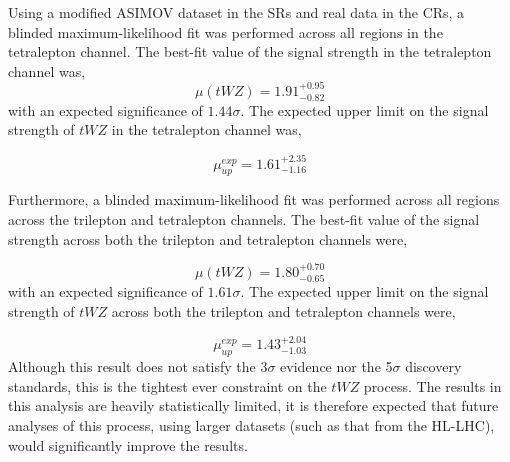 Using a modified ASIMOV dataset in the SRs and real data in the CRs, a blinded maximum-likelihood fit was performed across all regions in the tetralepton channel. The best-fit value of the signal strength in the tetralepton channel was,
\begin{equation}
  \mu (tWZ) =   1.91^{+0.95}_{-0.82}
\end{equation}
with an expected significance of $1.44\sigma$. The expected upper limit on the signal strength of $tWZ$ in the tetralepton channel was,

\begin{equation}
  \mu_{up}^{exp} =   1.61^{+2.35}_{-1.16}
\end{equation}

Furthermore, a blinded maximum-likelihood fit was performed across all regions across the trilepton and tetralepton channels. The best-fit value of the signal strength across both the trilepton and tetralepton channels were,

\begin{equation}
  \mu (tWZ) =   1.80^{+0.70}_{-0.65}
\end{equation}
with an expected significance of $1.61\sigma$. The expected upper limit on the signal strength of $tWZ$ across both the trilepton and tetralepton channels were,

\begin{equation}
  \mu_{up}^{exp} =   1.43^{+2.04}_{-1.03}
\end{equation}
 Although this result does not satisfy the 3$\sigma$ evidence nor the 5$\sigma$ discovery standards, this is the tightest ever constraint on the $tWZ$ process. The results in this analysis are heavily statistically limited, it is therefore expected that future analyses of this process, using larger datasets (such as that from the HL-LHC), would significantly improve the results.











